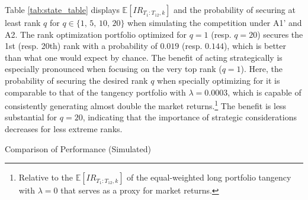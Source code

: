 \documentclass[3p,times,twocolumn]{elsarticle}
\begin{document}
Table \ref{tab:state_table} displays $\mathbb{E}[IR_{T_{1}:T_{12},k}]$ and the probability of securing at least rank $q$ for $q \in \{1,\,5,\,10,\,20\}$ when simulating the competition under A1' and A2.
The rank optimization portfolio optimized for $q=1$ (resp. $q=20$) secures the 1st (resp. 20th) rank with a probability of $0.019$ (resp. $0.144$), which is better than what one would expect by chance.
The benefit of acting strategically is especially pronounced when focusing on the very top rank ($q=1$).
Here, the probability of securing the desired rank $q$ when specially optimizing for it is comparable to that of the tangency portfolio with $\lambda=0.0003$, which is capable of consistently generating almost double the market returns.\footnote{
    Relative to the $\mathbb{E}[IR_{T_{1}:T_{12},k}]$ of the equal-weighted long portfolio tangency with $\lambda = 0$ that serves as a proxy for market returns.
}
The benefit is less substantial for $q=20$, indicating that the importance of strategic considerations decreases for less extreme ranks.

\begin{table}[!htbp]
    \fontsize{5}{5}\selectfont
    \centering
    \caption{Comparison of Performance (Simulated)}
    \label{tab:state_table}
\end{table}
\end{document}
